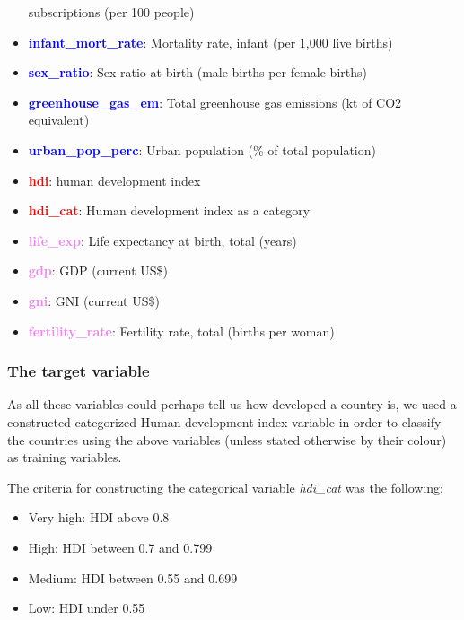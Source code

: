 \documentclass[]{article}
\begin{document}
\begin{itemize}
  subscriptions (per 100 people)
\item
  \textcolor{blue}{\textbf{infant\_mort\_rate}}: Mortality rate, infant
  (per 1,000 live births)
\item
  \textcolor{blue}{\textbf{sex\_ratio}}: Sex ratio at birth (male births
  per female births)
\item
  \textcolor{blue}{\textbf{greenhouse\_gas\_em}}: Total greenhouse gas
  emissions (kt of CO2 equivalent)
\item
  \textcolor{blue}{\textbf{urban\_pop\_perc}}: Urban population (\% of
  total population)
\item
  \textcolor{red}{\textbf{hdi}}: human development index
\item
  \textcolor{red}{\textbf{hdi\_cat}}: Human development index as a
  category
\item
  \textcolor{violet}{\textbf{life\_exp}}: Life expectancy at birth,
  total (years)
\item
  \textcolor{violet}{\textbf{gdp}}: GDP (current US\$)
\item
  \textcolor{violet}{\textbf{gni}}: GNI (current US\$)
\item
  \textcolor{violet}{\textbf{fertility\_rate}}: Fertility rate, total
  (births per woman)
\end{itemize}

\newpage

\hypertarget{the-target-variable}{%
\subsubsection{The target variable}\label{the-target-variable}}

As all these variables could perhaps tell us how developed a country is,
we used a constructed categorized Human development index variable in
order to classify the countries using the above variables (unless stated
otherwise by their colour) as training variables.

The criteria for constructing the categorical variable \emph{hdi\_cat}
was the following:

\begin{itemize}
    \item Very high: HDI above 0.8
    \item High: HDI between 0.7 and 0.799
    \item Medium: HDI between 0.55 and 0.699
    \item Low: HDI under 0.55
  \end{itemize}
\end{document}
